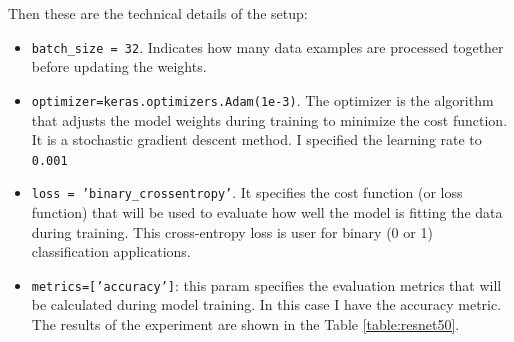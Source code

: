 Then these are the technical details of the setup:
\begin{itemize}
\item \texttt{batch\_size =  32}. Indicates how many data examples are processed together before updating the weights.
\item \texttt{optimizer=keras.optimizers.Adam(1e-3)}. The optimizer is the algorithm that adjusts the model weights during training to minimize the cost function. It is a stochastic gradient descent method. I specified the learning rate to \texttt{0.001}
\item \texttt{loss = 'binary\_crossentropy'}. It specifies the cost function (or loss function) that will be used to evaluate how well the model is fitting the data during training. This cross-entropy loss is user for binary (0 or 1) classification applications.
\item \texttt{metrics=['accuracy']}: this param specifies the evaluation metrics that will be calculated during model training. In this case I have the accuracy metric.
The results of the experiment are shown in the Table \ref{table:resnet50}.
\end{itemize}